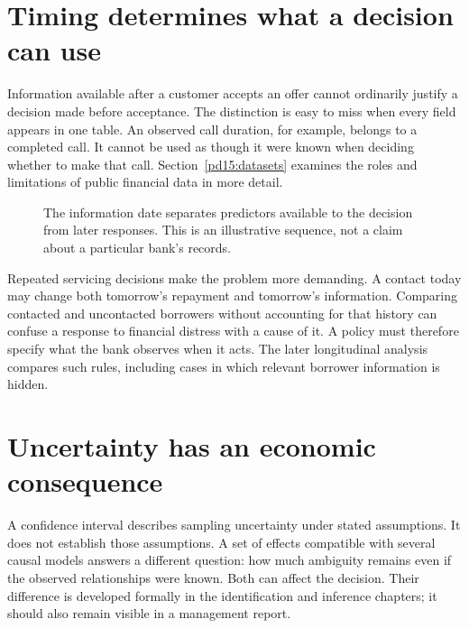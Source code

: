 \section{Timing determines what a decision can use}

Information available after a customer accepts an offer cannot ordinarily
justify a decision made before acceptance. The distinction is easy to miss
when every field appears in one table. An observed call duration, for example,
belongs to a completed call. It cannot be used as though it were known when
deciding whether to make that call. Section~\ref{pd15:datasets} examines the
roles and limitations of public financial data in more detail.

\begin{figure}[htbp]\centering
{}
\caption{The information date separates predictors available to the decision
from later responses. This is an illustrative sequence, not a claim about a
particular bank's records.}
\label{reading:time}
\end{figure}

Repeated servicing decisions make the problem more demanding. A contact today
may change both tomorrow's repayment and tomorrow's information. Comparing
contacted and uncontacted borrowers without accounting for that history can
confuse a response to financial distress with a cause of it. A policy must
therefore specify what the bank observes when it acts. The later longitudinal
analysis compares such rules, including cases in which relevant borrower
information is hidden.

\section{Uncertainty has an economic consequence}

A confidence interval describes sampling uncertainty under stated assumptions.
It does not establish those assumptions. A set of effects compatible with
several causal models answers a different question: how much ambiguity remains
even if the observed relationships were known. Both can affect the decision.
Their difference is developed formally in the identification and inference
chapters; it should also remain visible in a management report.

